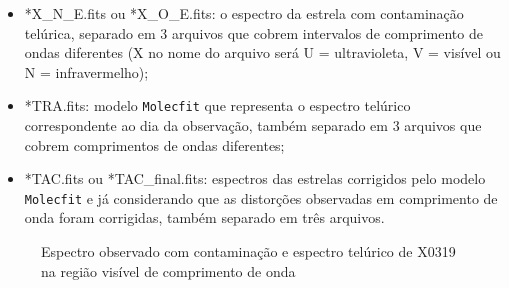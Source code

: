 \begin{itemize}
    \item *X\_N\_E.fits ou *X\_O\_E.fits: o espectro da estrela com contaminação telúrica, separado em 3 arquivos que cobrem intervalos de comprimento de ondas diferentes (X no nome do arquivo será U = ultravioleta, V = visível ou N = infravermelho);
    \item *TRA.fits: modelo \texttt{Molecfit} que representa o espectro telúrico correspondente ao dia da observação, também separado em 3 arquivos que cobrem comprimentos de ondas diferentes;
    \item *TAC.fits ou *TAC\_final.fits: espectros das estrelas corrigidos pelo modelo \texttt{Molecfit} e já considerando que as distorções observadas em comprimento de onda foram corrigidas, também separado em três arquivos.
\end{itemize}

\begin{figure}[htb]
  \centering
  \hfill
  \caption{Espectro observado com contaminação e espectro telúrico de X0319 na região visível de comprimento de onda}
  \label{fig:x0319-visible}
\end{figure}


